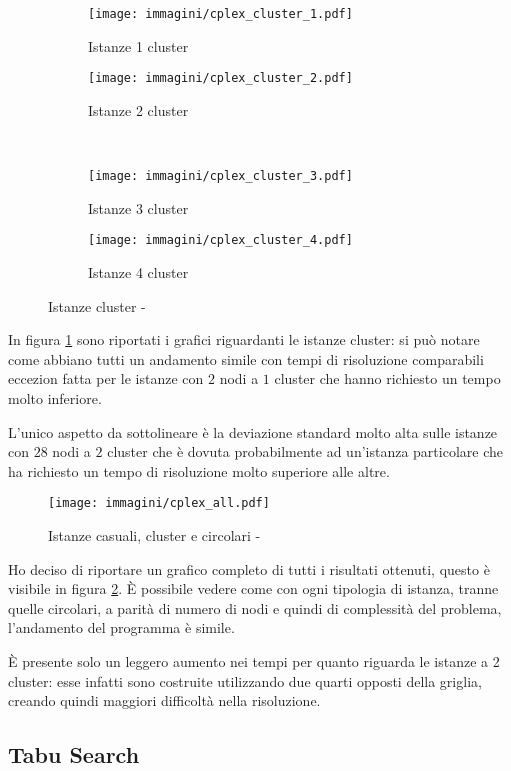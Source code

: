 \begin{figure}[htb]
	\centering
	\begin{subfigure}[b]{.45\textwidth}
		\texttt{[image: immagini/cplex\_cluster\_1.pdf]}
		\caption{Istanze 1 cluster}
	\end{subfigure}
	\quad
	\begin{subfigure}[b]{.45\textwidth}
		\texttt{[image: immagini/cplex\_cluster\_2.pdf]}
		\caption{Istanze 2 cluster}
	\end{subfigure}
	\\
	\begin{subfigure}[b]{.45\textwidth}
		\texttt{[image: immagini/cplex\_cluster\_3.pdf]}
		\caption{Istanze 3 cluster}
	\end{subfigure}
	\quad
	\begin{subfigure}[b]{.45\textwidth}
		\texttt{[image: immagini/cplex\_cluster\_4.pdf]}
		\caption{Istanze 4 cluster}
	\end{subfigure}
	\caption{Istanze cluster - }
	\label{fig:cluster cplex}
\end{figure}

In figura \ref{fig:cluster cplex} sono riportati i grafici riguardanti le istanze cluster: si può notare come abbiano tutti un andamento simile con tempi di risoluzione comparabili eccezion fatta per le istanze con $2$ nodi a $1$ cluster che hanno richiesto un tempo molto inferiore.

L'unico aspetto da sottolineare è la deviazione standard molto alta sulle istanze con $28$ nodi a $2$ cluster che è dovuta probabilmente ad un'istanza particolare che ha richiesto un tempo di risoluzione molto superiore alle altre.

\begin{figure}[htb]
	\centering
	\texttt{[image: immagini/cplex\_all.pdf]}
	\caption{Istanze casuali, cluster e circolari - }
	\label{fig:all cplex}
\end{figure}

Ho deciso di riportare un grafico completo di tutti i risultati ottenuti, questo è visibile in figura \ref{fig:all cplex}.
È possibile vedere come con ogni tipologia di istanza, tranne quelle circolari, a parità di numero di nodi e quindi di complessità del problema, l'andamento del programma è simile.

È presente solo un leggero aumento nei tempi per quanto riguarda le istanze a 2 cluster: esse infatti sono costruite utilizzando due quarti opposti della griglia, creando quindi maggiori difficoltà nella risoluzione.

\subsection{Tabu Search}